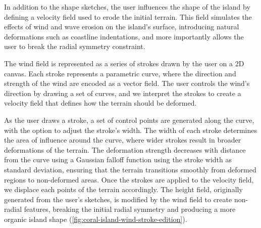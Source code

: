 In addition to the shape sketches, the user influences the shape of the island by defining a velocity field used to erode the initial terrain. This field simulates the effects of wind and wave erosion on the island's surface, introducing natural deformations such as coastline indentations, and more importantly allows the user to break the radial symmetry constraint.

The wind field is represented as a series of strokes drawn by the user on a 2D canvas. Each stroke represents a parametric curve, where the direction and strength of the wind are encoded as a vector field. The user controls the wind's direction by drawing a set of curves, and we interpret the strokes to create a velocity field that defines how the terrain should be deformed.

As the user draws a stroke, a set of control points are generated along the curve, with the option to adjust the stroke's width. The width of each stroke determines the area of influence around the curve, where wider strokes result in broader deformations of the terrain.
The deformation strength decreases with distance from the curve using a Gaussian falloff function using the stroke width as standard deviation, ensuring that the terrain transitions smoothly from deformed regions to non-deformed areas.
Once the strokes are applied to the velocity field, we displace each points of the terrain accordingly. The height field, originally generated from the user's sketches, is modified by the wind field to create non-radial features, breaking the initial radial symmetry and producing a more organic island shape (\cref{fig:coral-island-wind-stroke-edition}).


